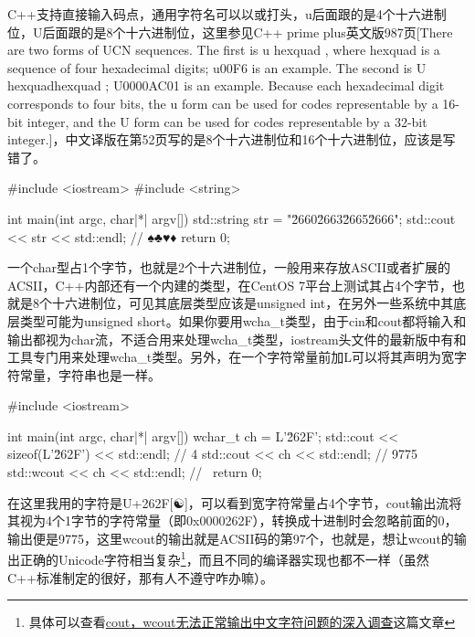 C++支持直接输入\thinspace\href{https://home.unicode.org/}{}\thinspace 码点，通用字符名可以以或打头，\mybackslash u后面跟的是4个十六进制位，\mybackslash U后面跟的是8个十六进制位，这里参见C++ prime plus英文版987页[There are two forms of UCN sequences. The first is \mybackslash u hexquad , where hexquad is a sequence of four hexadecimal digits; \mybackslash u00F6 is an example. The second is \mybackslash U hexquadhexquad ; \mybackslash U0000AC01 is an example. Because each hexadecimal digit corresponds to four bits, the \mybackslash u form can be used for codes representable by a 16-bit integer, and the \mybackslash U form can be used for codes representable by a 32-bit integer.]，中文译版在第52页写的是8个十六进制位和16个十六进制位，应该是写错了。

\begin{cpp}
#include <iostream>
#include <string>

int main(int argc, char|*| argv[]) {
    std::string str = "\u2660\u2663\u2665\u2666";
    std::cout << str << std::endl; // ♠♣♥♦
    return 0;
}
\end{cpp}

一个char型占1个字节，也就是2个十六进制位，一般用来存放ASCII或者扩展的ACSII，C++内部还有一个内建的类型，在CentOS 7平台上测试其占4个字节，也就是8个十六进制位，可见其底层类型应该是unsigned int，在另外一些系统中其底层类型可能为unsigned short。如果你要用wcha\_t类型，由于cin和cout都将输入和输出都视为char流，不适合用来处理wcha\_t类型，iostream头文件的最新版中有和工具专门用来处理wcha\_t类型。另外，在一个字符常量前加L可以将其声明为宽字符常量，字符串也是一样。

\begin{cpp}
#include <iostream>

int main(int argc, char|*| argv[]) {
    wchar_t ch = L'\u262F';
    std::cout << sizeof(L'\u262F') << std::endl; // 4
    std::cout << ch << std::endl; // 9775
    std::wcout << ch << std::endl; // \
    return 0;
}
\end{cpp}

在这里我用的字符是U+262F[☯]，可以看到宽字符常量占4个字节，cout输出流将其视为4个1字节的字符常量（即0x0000262F），转换成十进制时会忽略前面的0，输出便是9775，这里wcout的输出就是ACSII码的第97个，也就是\mybackslash ，想让wcout的输出正确的Unicode字符相当复杂\footnote{具体可以查看\thinspace\href{https://www.cnblogs.com/zyl910/archive/2013/01/20/wchar_crtbug_01.html}{cout，wcout无法正常输出中文字符问题的深入调查}这篇文章}，而且不同的编译器实现也都不一样（虽然C++标准制定的很好，那有人不遵守咋办嘛）。

